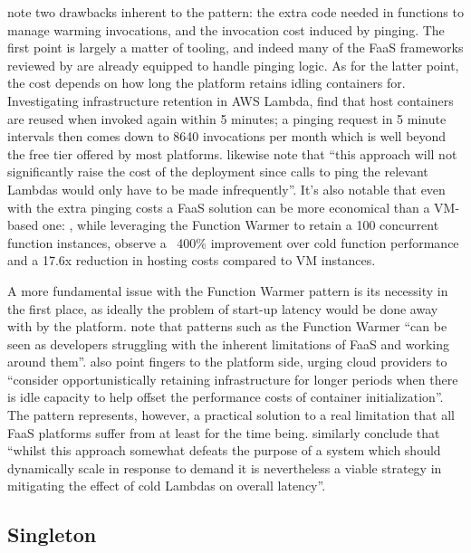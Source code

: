 \textcite{leitner18industrialpractice} note two drawbacks inherent to the pattern: the extra code needed in functions to manage warming invocations, and the invocation cost induced by pinging. The first point is largely a matter of tooling, and indeed many of the FaaS frameworks reviewed by \textcite{kritikos18frameworks} are already equipped to handle pinging logic. As for the latter point, the cost depends on how long the platform retains idling containers for. Investigating infrastructure retention in AWS Lambda, \textcite{lloydserverless} find that host containers are reused when invoked again within 5 minutes; a pinging request in 5 minute intervals then comes down to 8640 invocations per month which is well beyond the free tier offered by most platforms. \textcite{bardsley18optimizationStrategies} likewise note that ``this approach will not significantly raise the cost of the deployment since calls to ping the relevant Lambdas would only have to be made infrequently''. It's also notable that even with the extra pinging costs a FaaS solution can be more economical than a VM-based one: \textcite{lloyd18migration}, while leveraging the Function Warmer to retain a 100 concurrent function instances, observe a ~400\% improvement over cold function performance and a 17.6x reduction in hosting costs compared to VM instances.

A more fundamental issue with the Function Warmer pattern is its necessity in the first place, as ideally the problem of start-up latency would be done away with by the platform. \textcite{leitner18industrialpractice} note that patterns such as the Function Warmer ``can be seen as developers struggling with the inherent limitations of FaaS and working around them''. \textcite{lloydserverless} also point fingers to the platform side, urging cloud providers to ``consider opportunistically retaining infrastructure for longer periods when there is idle capacity to help offset the performance costs of container initialization''. The pattern represents, however, a practical solution to a real limitation that all FaaS platforms suffer from at least for the time being. \textcite{bardsley18optimizationStrategies} similarly conclude that ``whilst this approach somewhat defeats the purpose of a system which should dynamically scale in response to demand it is nevertheless a viable strategy in mitigating the effect of cold Lambdas on overall latency''.

\subsection{Singleton} \label{subsec:Singleton}

